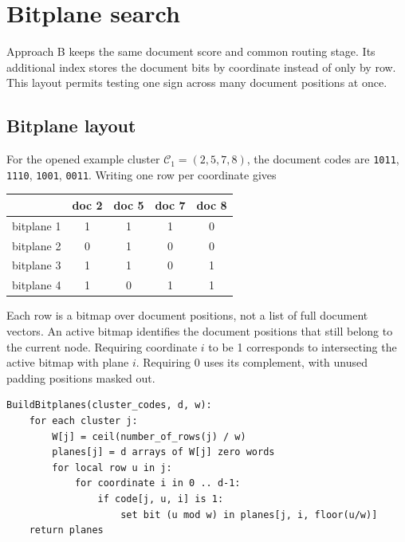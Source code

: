 \section{Bitplane search}
\label{sec:bitplanes}
Approach B keeps the same document score and common routing stage. Its additional index stores
the document bits by coordinate instead of only by row. This layout permits testing one sign
across many document positions at once.


\subsection{Bitplane layout}
For the opened example cluster $\mathcal C_1=(2,5,7,8)$, the document codes are
\texttt{1011}, \texttt{1110}, \texttt{1001}, \texttt{0011}. Writing one row per coordinate gives
\begin{center}
\begin{tabular}{@{}lcccc@{}}\toprule
 & doc 2 & doc 5 & doc 7 & doc 8\\\midrule
bitplane 1 & 1&1&1&0\\
bitplane 2 & 0&1&0&0\\
bitplane 3 & 1&1&0&1\\
bitplane 4 & 1&0&1&1\\\bottomrule
\end{tabular}
\end{center}
Each row is a bitmap over document positions, not a list of full document vectors. An active
bitmap identifies the document positions that still belong to the current node. Requiring coordinate
$i$ to be 1 corresponds to intersecting the active bitmap with plane $i$. Requiring 0 uses its
complement, with unused padding positions masked out.

\par\noindent\begin{minipage}{\linewidth}
\begin{lstlisting}[caption={Build the additional bitplane index.}]
BuildBitplanes(cluster_codes, d, w):
    for each cluster j:
        W[j] = ceil(number_of_rows(j) / w)
        planes[j] = d arrays of W[j] zero words
        for local row u in j:
            for coordinate i in 0 .. d-1:
                if code[j, u, i] is 1:
                    set bit (u mod w) in planes[j, i, floor(u/w)]
    return planes
\end{lstlisting}
\end{minipage}\par

